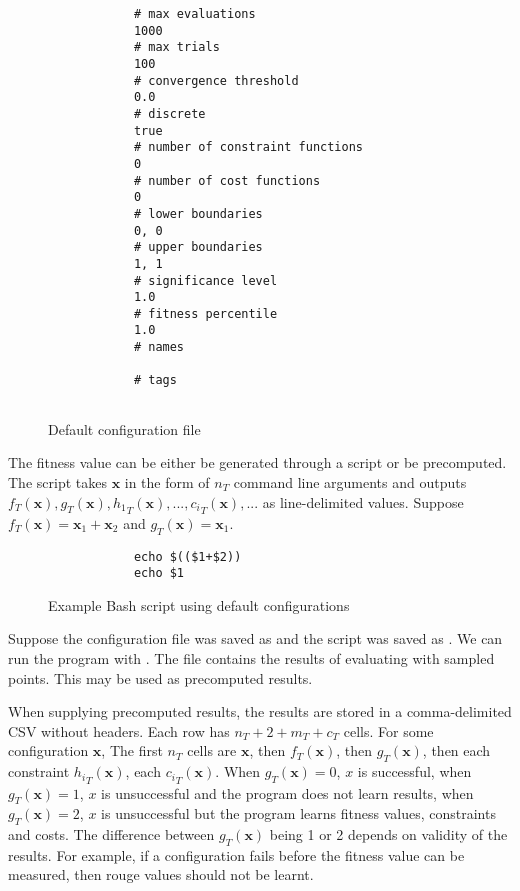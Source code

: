 \documentclass[10pt,a4paper]{article}
\begin{document}
\begin{figure}[H]
	\begin{framed}
		\begin{verbatim}
			# max evaluations
			1000
			# max trials
			100
			# convergence threshold
			0.0
			# discrete
			true
			# number of constraint functions
			0
			# number of cost functions
			0
			# lower boundaries
			0, 0
			# upper boundaries
			1, 1
			# significance level
			1.0
			# fitness percentile
			1.0
			# names
			
			# tags
			
		\end{verbatim}
	\end{framed}
	\caption{Default configuration file}
\end{figure}

The fitness value can be either be generated through a script or be precomputed. The script takes $\mathbf{x}$ in the form of $n_T$ command line arguments and outputs $f_T(\mathbf{x}),g_T(\mathbf{x}),{h_1}_T(\mathbf{x}),...,{c_i}_T(\mathbf{x}),...$ as line-delimited values. Suppose $f_T(\mathbf{x})=\mathbf{x}_1+\mathbf{x}_2$ and $g_T(\mathbf{x})=\mathbf{x}_1$.

\begin{figure}[H]
	\begin{framed}
		\begin{verbatim}
			echo $(($1+$2))
			echo $1
		\end{verbatim}
	\end{framed}
	\caption{Example Bash script using default configurations}
\end{figure}

Suppose the configuration file was saved as  and the script was saved as . We can run the program with . The file  contains the results of evaluating  with sampled points. This may be used as precomputed results.

When supplying precomputed results, the results are stored in a comma-delimited CSV without headers. Each row has $n_T+2+m_T+c_T$ cells. For some configuration $\mathbf{x}$, The first $n_T$ cells are $\mathbf{x}$, then $f_T(\mathbf{x})$, then $g_T(\mathbf{x})$, then each constraint ${h_i}_T(\mathbf{x})$, each ${c_i}_T(\mathbf{x})$. When $g_T(\mathbf{x})=0$, $x$ is successful, when $g_T(\mathbf{x})=1$, $x$ is unsuccessful and the program does not learn results, when $g_T(\mathbf{x})=2$, $x$ is unsuccessful but the program learns fitness values, constraints and costs. The difference between $g_T(\mathbf{x})$ being 1 or 2 depends on validity of the results. For example, if a configuration fails before the fitness value can be measured, then rouge values should not be learnt.
\end{document}
